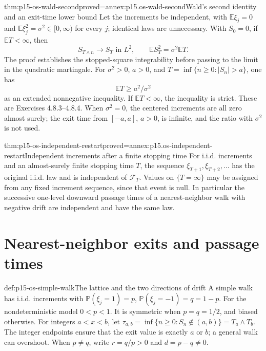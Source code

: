\begin{hbtheorem}{thm:p15-os-wald-second}{proved=annex:p15.os-wald-second}{Wald's second identity and an exit-time lower bound}
Let the increments be independent, with
\(\mathbb E\xi_j=0\) and
\(\mathbb E\xi_j^2=\sigma^2\in[0,\infty)\) for every \(j\);
identical laws are unnecessary. With \(S_0=0\), if
\(\mathbb ET<\infty\), then
\[
 S_{T\wedge n}\to S_T\text{ in }L^2,\qquad
 \mathbb ES_T^2=\sigma^2\mathbb ET.
 \]
The proof establishes the stopped-square integrability before
passing to the limit in the quadratic martingale.
For \(\sigma^2>0\), \(a>0\), and
\(T=\inf\{n\geq0:|S_n|>a\}\), one has
\[
 \mathbb ET\geq a^2/\sigma^2
 \]
as an extended nonnegative inequality. If \(\mathbb ET<\infty\),
the inequality is strict. These are Exercises 4.8.3--4.8.4.
When \(\sigma^2=0\), the centered increments are all zero
almost surely; the exit time from \([-a,a]\), \(a>0\), is
infinite, and the ratio with \(\sigma^2\) is not used.
\end{hbtheorem}

\begin{hblemma}{thm:p15-os-independent-restart}{proved=annex:p15.os-independent-restart}{Independent increments after a finite stopping time}
For i.i.d. increments and an almost-surely finite stopping time \(T\),
the sequence \(\xi_{T+1},\xi_{T+2},\ldots\) has the original
i.i.d. law and is independent of \(\mathcal F_T\).
Values on \(\{T=\infty\}\) may be assigned from any fixed
increment sequence, since that event is null.
In particular the successive one-level downward passage times
of a nearest-neighbor walk with negative drift are independent
and have the same law.
\end{hblemma}

\section{Nearest-neighbor exits and passage times}
\label{sec:p15-os-simple-walks}

\begin{hbdefinition}{def:p15-os-simple-walk}{The lattice and the two directions of drift}
A simple walk has i.i.d. increments with
\(\mathbb P(\xi_j=1)=p\), \(\mathbb P(\xi_j=-1)=q=1-p\).
For the nondeterministic model \(0<p<1\).
It is symmetric when \(p=q=1/2\), and biased otherwise.
For integers \(a<x<b\), let
\(\tau_{a,b}=\inf\{n\geq0:S_n\notin(a,b)\}=T_a\wedge T_b\).
The integer endpoints ensure that the exit value is exactly \(a\)
or \(b\); a general walk can overshoot.
When \(p\ne q\), write \(r=q/p>0\) and \(d=p-q\ne0\).
\end{hbdefinition}

